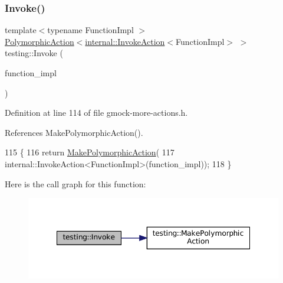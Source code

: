 \subsubsection{\texorpdfstring{Invoke()}{Invoke()}\hspace{0.1cm}{\footnotesize\ttfamily [1/2]}}
{\footnotesize\ttfamily template$<$typename Function\+Impl $>$ \\
\hyperlink{classtesting_1_1PolymorphicAction}{Polymorphic\+Action}$<$\hyperlink{classtesting_1_1internal_1_1InvokeAction}{internal\+::\+Invoke\+Action}$<$Function\+Impl$>$ $>$ testing\+::\+Invoke (\begin{DoxyParamCaption}\item[{Function\+Impl}]{function\+\_\+impl }\end{DoxyParamCaption})}



Definition at line 114 of file gmock-\/more-\/actions.\+h.



References Make\+Polymorphic\+Action().


\begin{DoxyCode}
115                                 \{
116   \textcolor{keywordflow}{return} \hyperlink{namespacetesting_a36bd06c5ea972c6df0bd9f40a7a94c65}{MakePolymorphicAction}(
117       internal::InvokeAction<FunctionImpl>(function\_impl));
118 \}
\end{DoxyCode}
Here is the call graph for this function\+:
\nopagebreak
\begin{figure}[H]
\begin{center}
\leavevmode
\includegraphics[width=348pt]{namespacetesting_a12aebaf8363d49a383047529f798b694_cgraph}
\end{center}
\end{figure}
\mbox{\label{namespacetesting_a80b82dc382445d240ff011f9c34aefc4}} 
